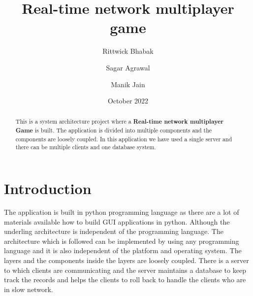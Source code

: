 \documentclass[manuscript,screen,review,nonacm]{acmart}
\begin{document}
\title{Real-time network multiplayer game}
\date{October 2022}

\author{Rittwick Bhabak}

\author{Sagar Agrawal}

\author{Manik Jain}


\begin{abstract}
This is a system architecture project where a \textbf{Real-time network multiplayer Game} is built. The application is divided into multiple components and the components are loosely coupled. In this application we have used a single server and there can be multiple clients and one database system. 
\end{abstract}



\maketitle

\section{Introduction}
The application is built in python programming language as there are a lot of materials available how to build GUI applications in python. Although the underling architecture is independent of the programming language. The architecture which is followed can be implemented by using any programming language and it is also independent of the platform and operating system. The layers and the components inside the layers are loosely coupled. 
There is a server to which clients are communicating and the server maintains a database to keep track the records and helps the clients to roll back to handle the clients who are in slow network.
\end{document}

